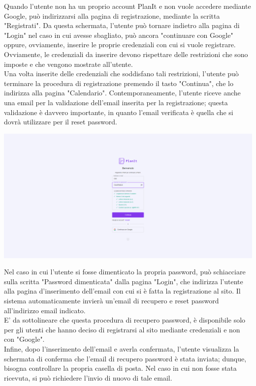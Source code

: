 Quando l'utente non ha un proprio account PlanIt e non vuole accedere mediante Google, può indirizzarsi alla pagina di registrazione, mediante la scritta "Registrati". Da questa schermata, l'utente può tornare indietro alla pagina di "Login" nel caso in cui avesse sbagliato, può ancora "continuare con Google" oppure, ovviamente, inserire le proprie credenziali con cui si vuole registrare. Ovviamente, le credenziali da inserire devono rispettare delle restrizioni che sono imposte e che vengono mostrate all'utente.\\
Una volta inserite delle credenziali che soddisfano tali restrizioni, l'utente può terminare la procedura di registrazione premendo il tasto "Continua", che lo indirizza alla pagina "Calendario". Contemporaneamente, l'utente riceve anche una email per la validazione dell'email inserita per la registrazione; questa validazione è davvero importante, in quanto l'email verificata è quella che si dovrà utilizzare per il reset password.

\begin{center}
    \includegraphics[width=1\textwidth, height=0.3\textheight]{img/png/FrontEnd/Homepage_Autenticazione/registrazione_valida.png}
\end{center}

Nel caso in cui l'utente si fosse dimenticato la propria password, può schiacciare sulla scritta "Password dimenticata" dalla pagina "Login", che indirizza l'utente alla pagina d'inserimento dell'email con cui si è fatta la registrazione al sito. Il sistema automaticamente invierà un'email di recupero e reset password all'indirizzo email indicato. \\
E' da sottolineare che questa procedura di recupero password, è disponibile solo per gli utenti che hanno deciso di registrarsi al sito mediante credenziali e non con "Google". \\
Infine, dopo l'inserimento dell'email e averla confermata, l'utente visualizza la schermata di conferma che l'email di recupero password è stata inviata; dunque, bisogna controllare la propria casella di posta. Nel caso in cui non fosse stata ricevuta, si può richiedere l'invio di nuovo di tale email.

